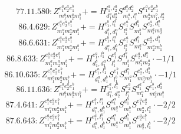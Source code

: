 \documentclass[letterpaper,10pt,fleqn,leqno,onecolumn]{article}
\begin{document}
\begin{equation} \;\;\;\;\;\;  77.11.580: Z^{e_{1}^{a}e_{2}^{a}e_{1}^{b}}_{m_{1}^{a}m_{2}^{a}m_{1}^{b}}+=H^{l_{1}^{a},l_{2}^{a}}_{d_{1}^{a}d_{2}^{a}}S^{d_{1}^{a}d_{2}^{a}}_{m_{1}^{a},l_{1}^{a}}S^{e_{1}^{a}e_{2}^{a}e_{1}^{b}}_{m_{2}^{a}m_{1}^{b},l_{2}^{a}} \end{equation}
\begin{equation} \;\;\;\;\;\;  86.4.629: Z^{e_{1}^{a}e_{2}^{a}e_{1}^{b}}_{m_{1}^{a}m_{2}^{a}m_{1}^{b}}+=H^{e_{1}^{b},l_{1}^{a}}_{d_{1}^{b},d_{1}^{a}}S^{e_{1}^{a}}_{l_{1}^{a}}S^{d_{1}^{b}}_{m_{1}^{b}}S^{e_{2}^{a},d_{1}^{a}}_{m_{1}^{a}m_{2}^{a}} \end{equation}
\begin{equation} \;\;\;\;\;\;  86.6.631: Z^{e_{1}^{a}e_{2}^{a}e_{1}^{b}}_{m_{1}^{a}m_{2}^{a}m_{1}^{b}}+=H^{e_{1}^{b},l_{1}^{a}}_{d_{1}^{a},d_{1}^{b}}S^{e_{1}^{a}}_{l_{1}^{a}}S^{d_{1}^{a}}_{m_{1}^{a}}S^{e_{2}^{a},d_{1}^{b}}_{m_{2}^{a}m_{1}^{b}} \end{equation}
\begin{equation} \;\;\;\;\;\;  86.8.633: Z^{e_{1}^{a}e_{2}^{a}e_{1}^{b}}_{m_{1}^{a}m_{2}^{a}m_{1}^{b}}+=H^{e_{1}^{a},l_{1}^{b}}_{d_{1}^{b},d_{1}^{a}}S^{e_{1}^{b}}_{l_{1}^{b}}S^{d_{1}^{b}}_{m_{1}^{b}}S^{e_{2}^{a},d_{1}^{a}}_{m_{1}^{a}m_{2}^{a}}\cdot -1/1 \end{equation}
\begin{equation} \;\;\;\;\;\;  86.10.635: Z^{e_{1}^{a}e_{2}^{a}e_{1}^{b}}_{m_{1}^{a}m_{2}^{a}m_{1}^{b}}+=H^{e_{1}^{a},l_{1}^{b}}_{d_{1}^{a},d_{1}^{b}}S^{e_{1}^{b}}_{l_{1}^{b}}S^{d_{1}^{a}}_{m_{1}^{a}}S^{e_{2}^{a},d_{1}^{b}}_{m_{2}^{a}m_{1}^{b}}\cdot -1/1 \end{equation}
\begin{equation} \;\;\;\;\;\;  86.11.636: Z^{e_{1}^{a}e_{2}^{a}e_{1}^{b}}_{m_{1}^{a}m_{2}^{a}m_{1}^{b}}+=H^{e_{1}^{a},l_{1}^{a}}_{d_{1}^{a},d_{2}^{a}}S^{e_{2}^{a}}_{l_{1}^{a}}S^{d_{1}^{a}}_{m_{1}^{a}}S^{e_{1}^{b},d_{2}^{a}}_{m_{2}^{a}m_{1}^{b}} \end{equation}
\begin{equation} \;\;\;\;\;\;  87.4.641: Z^{e_{1}^{a}e_{2}^{a}e_{1}^{b}}_{m_{1}^{a}m_{2}^{a}m_{1}^{b}}+=H^{e_{1}^{b},l_{1}^{a}}_{d_{1}^{a},d_{1}^{b}}S^{d_{1}^{a}}_{m_{1}^{a}}S^{d_{1}^{b}}_{m_{1}^{b}}S^{e_{1}^{a}e_{2}^{a}}_{m_{2}^{a},l_{1}^{a}}\cdot -2/2 \end{equation}
\begin{equation} \;\;\;\;\;\;  87.6.643: Z^{e_{1}^{a}e_{2}^{a}e_{1}^{b}}_{m_{1}^{a}m_{2}^{a}m_{1}^{b}}+=H^{e_{1}^{a},l_{1}^{b}}_{d_{1}^{a},d_{1}^{b}}S^{d_{1}^{a}}_{m_{1}^{a}}S^{d_{1}^{b}}_{m_{1}^{b}}S^{e_{2}^{a}e_{1}^{b}}_{m_{2}^{a},l_{1}^{b}}\cdot -2/2 \end{equation}
\end{document}
